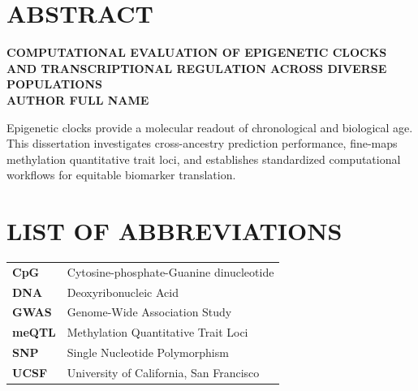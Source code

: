 \documentclass[12pt,oneside]{report}
\begin{document}
\chapter*{ABSTRACT}
\doublespacing
\begin{center}
  \textbf{COMPUTATIONAL EVALUATION OF EPIGENETIC CLOCKS AND TRANSCRIPTIONAL REGULATION ACROSS DIVERSE POPULATIONS}\\[0.08in]
  \textbf{AUTHOR FULL NAME}
\end{center}
\vspace{0.05in}

\noindent Epigenetic clocks provide a molecular readout of chronological and biological age. This dissertation investigates cross-ancestry prediction performance, fine-maps methylation quantitative trait loci, and establishes standardized computational workflows for equitable biomarker translation.
\clearpage

\tableofcontents
\clearpage

\listoffigures
\clearpage

\listoftables
\clearpage

\chapter*{LIST OF ABBREVIATIONS}
\doublespacing
\begin{tabular}{lp{5in}}
  \textbf{CpG} & Cytosine-phosphate-Guanine dinucleotide \\
  \textbf{DNA} & Deoxyribonucleic Acid \\
  \textbf{GWAS} & Genome-Wide Association Study \\
  \textbf{meQTL} & Methylation Quantitative Trait Loci \\
  \textbf{SNP} & Single Nucleotide Polymorphism \\
  \textbf{UCSF} & University of California, San Francisco \\
\end{tabular}
\clearpage

\setcounter{page}{1}
\doublespacing
\end{document}
